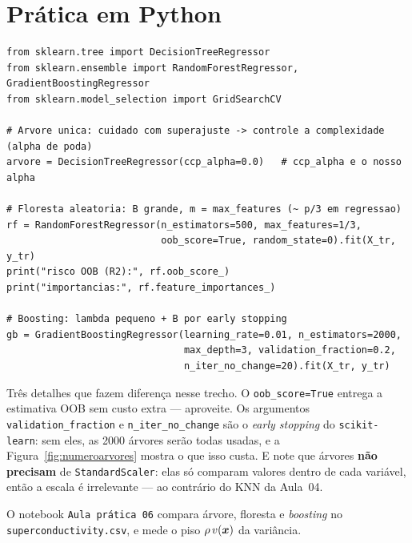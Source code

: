 \documentclass[11pt,a4paper]{article}
\begin{document}
\section{Prática em Python}
\begin{lstlisting}
from sklearn.tree import DecisionTreeRegressor
from sklearn.ensemble import RandomForestRegressor, GradientBoostingRegressor
from sklearn.model_selection import GridSearchCV

# Arvore unica: cuidado com superajuste -> controle a complexidade (alpha de poda)
arvore = DecisionTreeRegressor(ccp_alpha=0.0)   # ccp_alpha e o nosso alpha

# Floresta aleatoria: B grande, m = max_features (~ p/3 em regressao)
rf = RandomForestRegressor(n_estimators=500, max_features=1/3,
                           oob_score=True, random_state=0).fit(X_tr, y_tr)
print("risco OOB (R2):", rf.oob_score_)
print("importancias:", rf.feature_importances_)

# Boosting: lambda pequeno + B por early stopping
gb = GradientBoostingRegressor(learning_rate=0.01, n_estimators=2000,
                               max_depth=3, validation_fraction=0.2,
                               n_iter_no_change=20).fit(X_tr, y_tr)
\end{lstlisting}

\begin{observacao}
Três detalhes que fazem diferença nesse trecho. O \texttt{oob\_score=True} entrega a
estimativa OOB sem custo extra --- aproveite. Os argumentos
\texttt{validation\_fraction} e \texttt{n\_iter\_no\_change} são o \emph{early
stopping} do \texttt{scikit-learn}: sem eles, as 2000 árvores serão todas usadas, e
a Figura~\ref{fig:numeroarvores} mostra o que isso custa. E note que árvores
\textbf{não precisam} de \texttt{StandardScaler}: elas só comparam valores dentro de
cada variável, então a escala é irrelevante --- ao contrário do KNN da Aula~04.
\end{observacao}

O notebook \texttt{Aula prática 06} compara árvore, floresta e \emph{boosting} no
\texttt{superconductivity.csv}, e mede o piso $\rho\,v(\bm{x})$ da variância.

\end{document}
